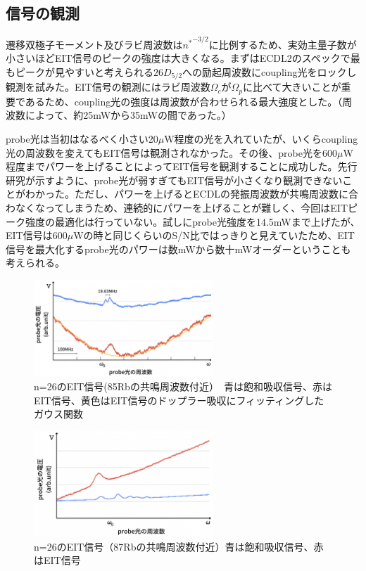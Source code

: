 \documentclass[dvipdfmx]{jsarticle}
\begin{document}
\subsection{信号の観測}
遷移双極子モーメント及びラビ周波数は${n^*}^{-3/2}$に比例するため\cite{yuma}、実効主量子数が小さいほどEIT信号のピークの強度は大きくなる。まずはECDL2のスペックで最もピークが見やすいと考えられる$26D_{5/2}$への励起周波数にcoupling光をロックし観測を試みた。EIT信号の観測にはラビ周波数$\Omega_c$が$\Omega_p$に比べて大きいことが重要であるため、coupling光の強度は周波数が合わせられる最大強度とした。（周波数によって、約25mWから35mWの間であった。）

probe光は当初はなるべく小さい20$\mu$W程度の光を入れていたが、いくらcoupling光の周波数を変えてもEIT信号は観測されなかった。その後、probe光を600$\mu$W程度までパワーを上げることによってEIT信号を観測することに成功した。先行研究\cite{optimize}が示すように、probe光が弱すぎてもEIT信号が小さくなり観測できないことがわかった。ただし、パワーを上げるとECDLの発振周波数が共鳴周波数に合わなくなってしまうため、連続的にパワーを上げることが難しく、今回はEITピーク強度の最適化は行っていない。試しにprobe光強度を14.5mWまで上げたが、EIT信号は600$\mu$Wの時と同じくらいのS/N比ではっきりと見えていたため、EIT信号を最大化するprobe光のパワーは数mWから数十mWオーダーということも考えられる。

\begin{figure}
\centering
\includegraphics[width=0.6\textwidth]{images/eit26.png}
\caption{\label{fig:eit26}n=26のEIT信号(85Rbの共鳴周波数付近）　青は飽和吸収信号、赤はEIT信号、黄色はEIT信号のドップラー吸収にフィッティングしたガウス関数}
\end{figure}
\begin{figure}
\centering
\includegraphics[width=0.6\textwidth]{images/eit87.png}
\caption{\label{fig:eit87}n=26のEIT信号（87Rbの共鳴周波数付近）青は飽和吸収信号、赤はEIT信号}
\end{figure}
\end{document}
